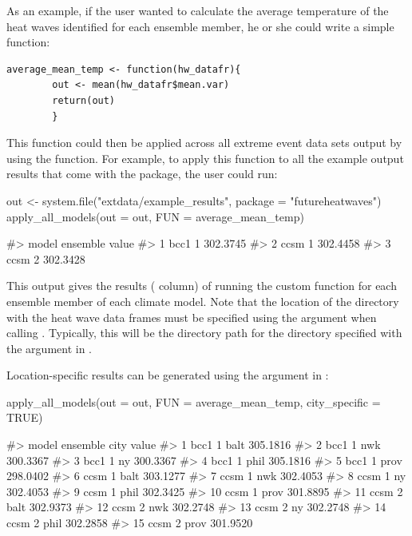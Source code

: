 As an example, if the user wanted to calculate the average temperature
of the heat waves identified for each ensemble member, he or she could
write a simple function:

\begin{verbatim}
average_mean_temp <- function(hw_datafr){
        out <- mean(hw_datafr$mean.var)
        return(out)
        }
\end{verbatim}

\noindent This function could then be applied across all extreme event
data sets output by  using the
 function. For example, to apply this function
to all the example output results that come with the package, the user
could run:

\begin{Schunk}
\begin{Sinput}
out <- system.file("extdata/example_results", package = "futureheatwaves")
apply_all_models(out = out, FUN = average_mean_temp)
\end{Sinput}
\begin{Soutput}
#>   model ensemble    value
#> 1  bcc1        1 302.3745
#> 2  ccsm        1 302.4458
#> 3  ccsm        2 302.3428
\end{Soutput}
\end{Schunk}

This output gives the results ( column) of running the
custom function for each ensemble member of each climate model. Note
that the location of the directory with the heat wave data frames must
be specified using the  argument when calling
. Typically, this will be the directory path
for the directory specified with the  argument in
.

Location-specific results can be generated using the
 argument in :

\begin{Schunk}
\begin{Sinput}
apply_all_models(out = out, FUN = average_mean_temp, city_specific = TRUE)
\end{Sinput}
\begin{Soutput}
#>    model ensemble city    value
#> 1   bcc1        1 balt 305.1816
#> 2   bcc1        1  nwk 300.3367
#> 3   bcc1        1   ny 300.3367
#> 4   bcc1        1 phil 305.1816
#> 5   bcc1        1 prov 298.0402
#> 6   ccsm        1 balt 303.1277
#> 7   ccsm        1  nwk 302.4053
#> 8   ccsm        1   ny 302.4053
#> 9   ccsm        1 phil 302.3425
#> 10  ccsm        1 prov 301.8895
#> 11  ccsm        2 balt 302.9373
#> 12  ccsm        2  nwk 302.2748
#> 13  ccsm        2   ny 302.2748
#> 14  ccsm        2 phil 302.2858
#> 15  ccsm        2 prov 301.9520
\end{Soutput}
\end{Schunk}

